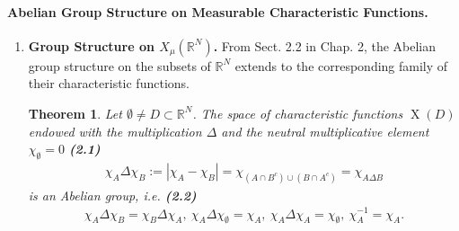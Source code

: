 \documentclass{book}
\numberwithin{equation}{section}
\newtheorem{theorem}{Theorem}[section]
\begin{document}
\paragraph{Abelian Group Structure on Measurable Characteristic Functions.}
\begin{enumerate}
    \item \textbf{Group Structure on $X_\mu(\mathbb{R}^N)$.} From Sect. 2.2 in Chap. 2, the Abelian group structure on the subsets of $\mathbb{R}^N$ extends to the corresponding family of their characteristic functions.
    
    \begin{theorem}
        Let $\emptyset\ne D\subset\mathbb{R}^N$. The space of characteristic functions $\operatorname{X}(D)$ endowed with the multiplication $\Delta$ and the neutral multiplicative element $\chi_\emptyset = 0$ \textbf{(2.1)}
        \begin{align*}
            \chi_A\Delta\chi_B := \left|\chi_A - \chi_B\right| = \chi_{(A\cap B^c)\cup(B\cap A^c)} = \chi_{A\Delta B}
        \end{align*}
        is an Abelian group, i.e. \textbf{(2.2)}
        \begin{align*}
            \chi_A\Delta\chi_B = \chi_B\Delta\chi_A,\ \chi_A\Delta\chi_\emptyset = \chi_A,\ \chi_A\Delta\chi_A = \chi_\emptyset,\ \chi_A^{-1} = \chi_A.
        \end{align*}
    \end{theorem}


\end{enumerate}
\end{document}
